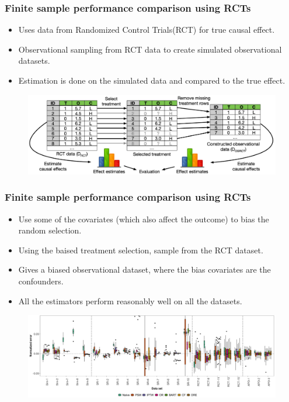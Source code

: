 \documentclass{beamer}
\begin{document}
\begin{frame}
	\frametitle{Finite sample performance comparison using RCTs}
	\begin{itemize}
		\item Uses data from Randomized Control Trials(RCT) for true causal effect.
		\item Observational sampling from RCT data to create simulated
			observational datasets.
		\item Estimation is done on the simulated data and compared to the true effect.
	\end{itemize}

	\begin{figure}
		\includegraphics[width=\textwidth]{fig_osrct.jpg}
	\end{figure}
\end{frame}

\begin{frame}
	\frametitle{Finite sample performance comparison using RCTs}
	\begin{itemize}
		\item Use some of the covariates (which also affect the outcome) to bias the random
			selection.
		\item Using the baised treatment selection, sample from the RCT dataset.
		\item Gives a biased observational dataset, where the bias covariates are the 
			confounders.
		\item All the estimators perform reasonably well on all the datasets.
	\end{itemize}

	\begin{figure}
		\includegraphics[width=\textwidth]{fig_rct.jpg}
	\end{figure}

\end{frame}
\end{document}

